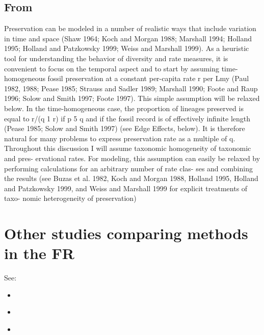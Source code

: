 \documentclass[12pt,twoside,a4paper,pdftex]{scrbook}
\begin{document}
\subsection{From \cite{Foote00}}

Preservation can be modeled in a number of realistic ways that include variation in time and space (Shaw 1964; Koch and Morgan 1988; Marshall 1994; Holland 1995; Holland and Patzkowsky 1999; Weiss and Marshall 1999). As a heuristic tool for understanding the behavior of diversity and rate measures, it is convenient to focus on the temporal aspect and to start by assuming time-homogeneous fossil preservation at a constant per-capita rate r per Lmy (Paul 1982, 1988; Pease 1985; Strauss and Sadler 1989; Marshall 1990; Foote and Raup 1996; Solow and Smith 1997; Foote 1997). This simple assumption will be relaxed below. In the time-homogeneous case, the proportion of lineages preserved is equal to r/(q 1 r) if p 5 q and if the fossil record is of effectively infinite length (Pease 1985; Solow and Smith 1997) (see Edge Effects, below). It is therefore natural for many problems to express preservation rate as a multiple of q. Throughout this discussion I will assume taxonomic homogeneity of taxonomic and pres- ervational rates. For modeling, this assumption can easily be relaxed by performing calculations for an arbitrary number of rate clas- ses and combining the results (see Buzas et al. 1982, Koch and Morgan 1988, Holland 1995, Holland and Patzkowsky 1999, and Weiss and Marshall 1999 for explicit treatments of taxo- nomic heterogeneity of preservation)



\section{Other studies comparing methods in the FR}

See:

\begin{itemize} 
\item \cite{Alroy00}
\item \cite{Alroy10}
\item \cite{Alroy14}
\end{itemize}




\singlespacing 


\end{document}
